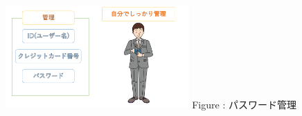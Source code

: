 \documentclass[a4paper,12pt]{jarticle}
\begin{document}
\begin{enumerate}
\begin{itemize}
\begin{figure}[h]
              \centering
                \begin{minipage}{5.228cm}
                  {\upshape
                    \includegraphics[width=7.000cm]{pswd_image_imp3.pdf}
                    \newline
                    Figure {\theFigure\label{seq:refFigure23}}:
                    パスワード管理}
                \end{minipage}
              \end{figure}
              
              
          \end{itemize}


\end{enumerate}
\end{document}
